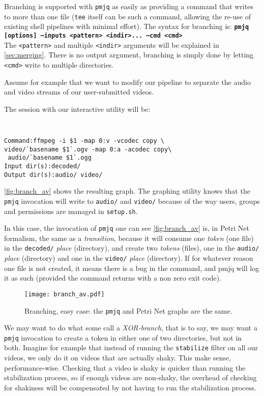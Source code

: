 \documentclass[letterpaper,twocolumn,10pt]{article}
\begin{document}
Branching is supported with {\tt pmjq} as easily as providing a command that writes to more than one file ({\tt tee} itself can be such a command, allowing the re-use of existing shell pipelines with minimal effort). The syntax for branching  is:
   {\bf \tt pmjq [options] --inputs <pattern> <indir>... --cmd <cmd> \\}
   The {\tt <pattern>} and multiple {\tt <indir>} arguments will be explained in \autoref{sec:merging}. There is no output argument, branching is simply done by letting {\tt <cmd>} write to multiple directories.

   Assume for example that we want to modify our pipeline to separate the audio and video streams of our user-submitted videos. 

   The session with our interactive utility will be:
{\tt \small
\begin{verbatim}
Command:ffmpeg -i $1 -map 0:v -vcodec copy \
video/`basename $1`.ogv -map 0:a -acodec copy\
 audio/`basename $1`.ogg
Input dir(s):decoded/
Output dir(s):audio/ video/
\end{verbatim}
}

\autoref{fig:branch_av} shows the resulting graph. The graphing utility knows that the {\tt pmjq} invocation will write to {\tt audio/} and {\tt video/} because of the way users, groups and permissions are managed in {\tt setup.sh}.

In this case, the invocation of {\tt pmjq} one can see \autoref{fig:branch_av} is, in Petri Net formalism, the same as a \emph{transition}, because it will consume one \emph{token} (one file) in the {\tt decoded/} \emph{place} (directory), and create two \emph{tokens} (files), one in the {\tt audio/} \emph{place} (directory) and one in the {\tt video/} \emph{place} (directory). If for whatever reason one file is not created, it means there is a bug in the command, and pmjq will log it as such (provided the command returns with a non zero exit code).

\begin{figure}[t]
\begin{center}
\texttt{[image: branch\_av.pdf]}
\end{center}
\caption{Branching, easy case: the {\tt pmjq} and Petri Net graphs are the same.}
\label{fig:branch_av}
\end{figure}

We may want to do what some call a \emph{XOR-branch}, that is to say, we may want a {\tt pmjq} invocation to create a token in either one of two directories, but not in both. Imagine for example that instead of running the {\tt stabilize} filter on all our videos, we only do it on videos that are actually shaky. This make sense, performance-wise. Checking that a video is shaky is quicker than running the stabilization process, so if enough videos are non-shaky, the overhead of checking for shakiness will be compensated by not having to run the stabilization process.
\end{document}
